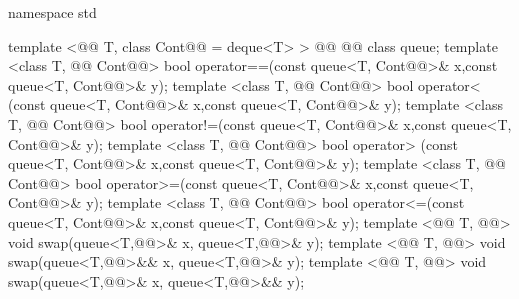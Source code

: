\documentclass[american,twoside]{book}
\begin{document}
\begin{codeblock}
namespace std {
  template <@@ T, class Cont@@ = deque<T> >
    @@
            @@
    class queue;
  template <class T, @@ Cont@@>
    bool operator==(const queue<T, Cont@@>& x,const queue<T, Cont@@>& y);
  template <class T, @@ Cont@@>
    bool operator< (const queue<T, Cont@@>& x,const queue<T, Cont@@>& y);
  template <class T, @@ Cont@@>
    bool operator!=(const queue<T, Cont@@>& x,const queue<T, Cont@@>& y);
  template <class T, @@ Cont@@>
    bool operator> (const queue<T, Cont@@>& x,const queue<T, Cont@@>& y);
  template <class T, @@ Cont@@>
    bool operator>=(const queue<T, Cont@@>& x,const queue<T, Cont@@>& y);
  template <class T, @@ Cont@@>
    bool operator<=(const queue<T, Cont@@>& x,const queue<T, Cont@@>& y);
  template <@@ T, @@>
    void swap(queue<T,@@>& x, queue<T,@@>& y);
  template <@@ T, @@>
    void swap(queue<T,@@>&& x, queue<T,@@>& y);
  template <@@ T, @@>
    void swap(queue<T,@@>& x, queue<T,@@>&& y);

}
\end{codeblock}
\end{document}
